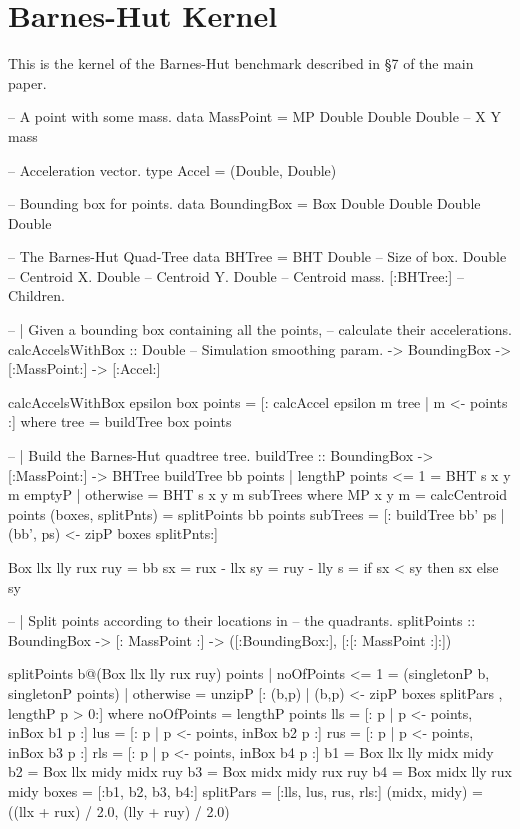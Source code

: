 \clearpage{}
\section{Barnes-Hut Kernel}
This is the kernel of the Barnes-Hut benchmark described in \S7 of the main paper.
\begin{small}
\begin{code}
-- A point with some mass.
data MassPoint   = MP  Double Double Double
--                       X      Y     mass

-- Acceleration vector.
type Accel       = (Double, Double)

-- Bounding box for points.
data BoundingBox = Box Double Double Double Double

-- The Barnes-Hut Quad-Tree
data BHTree
    = BHT Double          -- Size of box.
          Double          -- Centroid X.
          Double          -- Centroid Y.
          Double          -- Centroid mass.
          [:BHTree:]      -- Children.

-- | Given a bounding box containing all the points,
--   calculate their accelerations.
calcAccelsWithBox
    :: Double             -- Simulation smoothing param.
    -> BoundingBox -> [:MassPoint:] -> [:Accel:]

calcAccelsWithBox epsilon box points
 = [: calcAccel epsilon m tree | m <- points :]
 where tree = buildTree box points

-- | Build the Barnes-Hut quadtree tree.
buildTree :: BoundingBox -> [:MassPoint:] -> BHTree
buildTree bb points
 | lengthP points <= 1      = BHT s x y m emptyP
 | otherwise                = BHT s x y m subTrees
 where  MP x y m            = calcCentroid points
        (boxes, splitPnts)  = splitPoints bb points
        subTrees               
             = [: buildTree bb' ps 
                  | (bb', ps) <- zipP boxes splitPnts:]
  
        Box llx lly rux ruy = bb
        sx   = rux - llx
        sy   = ruy - lly
        s    = if sx < sy then sx else sy

-- | Split points according to their locations in
--   the quadrants.
splitPoints
        :: BoundingBox
        -> [: MassPoint :]
        -> ([:BoundingBox:], [:[: MassPoint :]:])

splitPoints b@(Box llx lly rux  ruy) points 
  | noOfPoints <= 1 = (singletonP b, singletonP points)
  | otherwise         
  = unzipP [: (b,p) | (b,p) <- zipP boxes splitPars
                    , lengthP p > 0:]
  where noOfPoints  = lengthP points
        lls         = [: p | p <- points, inBox b1 p :]
        lus         = [: p | p <- points, inBox b2 p :]
        rus         = [: p | p <- points, inBox b3 p :]
        rls         = [: p | p <- points, inBox b4 p :]
        b1          = Box llx  lly  midx midy
        b2          = Box llx  midy midx  ruy
        b3          = Box midx midy rux   ruy
        b4          = Box midx lly  rux  midy
        boxes       = [:b1,  b2,  b3,  b4:] 
        splitPars   = [:lls, lus, rus, rls:]
        (midx,  midy) = ((llx + rux) / 2.0, (lly + ruy) / 2.0) 
\end{code}
\end{small}

